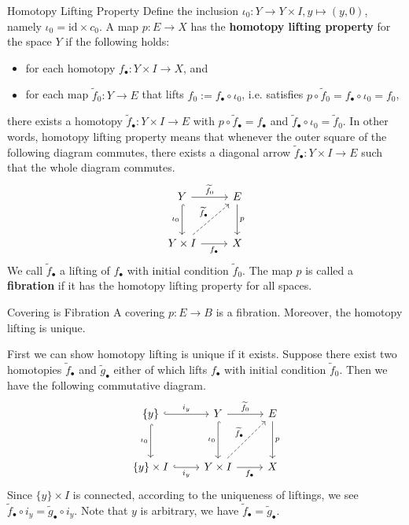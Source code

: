 \documentclass{report}
\begin{document}
\begin{definition}{Homotopy Lifting Property}{}
	Define the inclusion $\iota_0:Y\to Y\times I,y\mapsto(y,0)$, namely $\iota_0=\mathrm{id}\times c_0$. A map $p: E \rightarrow X$ has the \textbf{homotopy lifting property} for the space $Y$ if the following holds:
	\begin{itemize}
		\item for each homotopy $f_\bullet: Y \times I \rightarrow X$, and
		\item for each map $\widetilde{f}_0: Y \rightarrow E$ that lifts $f_0:=f_{\bullet} \circ\iota_0$, i.e. satisfies $p \circ \widetilde{f}_0=f_{\bullet} \circ\iota_0=f_0$,
	\end{itemize}
	there exists a homotopy $\widetilde{f}_{\bullet}: Y \times I \rightarrow E$ with $p \circ \widetilde{f}_{\bullet}=f_{\bullet}$ and $ \widetilde{f}_{\bullet} \circ \iota_0=\widetilde{f}_0$. In other words, homotopy lifting property means that whenever the outer square of the following diagram commutes, there exists a diagonal arrow $\widetilde{f}_{\bullet}:Y\times I\to E$ such that the whole diagram commutes.
	\[
		\begin{tikzcd}[ampersand replacement=\&]
			Y \arrow[r, "\widetilde{f}_0"] \arrow[d, "\iota_0"', hook]                      \& E \arrow[d, "p"] \\ [+10pt]
			Y\times I \arrow[r, "f_\bullet"'] \arrow[ru, "\widetilde{f}_{\bullet}", dashed] \& X
		\end{tikzcd}
	\]
	We call $\widetilde{f}_{\bullet}$ a lifting of $f_{\bullet}$ with initial condition $\widetilde{f}_0$. The map $p$ is called a \textbf{fibration} if it has the homotopy lifting property for all spaces.
\end{definition}


\begin{theorem}{Covering is Fibration}{}
	A covering $p: E \rightarrow B$ is a fibration. Moreover, the homotopy lifting is unique.
\end{theorem}

\begin{prf}
	First we can show homotopy lifting is unique if it exists. Suppose there exist two homotopies $\widetilde{f}_{\bullet}$ and $\widetilde{g}_{\bullet}$ either of which lifts $f_{\bullet}$ with initial condition $\widetilde{f}_0$. Then we have the following commutative diagram.
	\[
		\begin{tikzcd}[ampersand replacement=\&]
			\{y\}\arrow[r, "i_y", hook]\arrow[d, "\iota_0"', hook]\&Y \arrow[r, "\widetilde{f}_0"] \arrow[d, "\iota_0"', hook]                      \& E \arrow[d, "p"] \\ [+13pt]
			\{y\} \arrow[r, "i_y"', hook]  \times I\&Y\times I \arrow[r, "f_\bullet"'] \arrow[ru, "\widetilde{f}_{\bullet}", dashed] \& X
		\end{tikzcd}
	\]
	Since $\{y\}\times I$ is connected, according to the uniqueness of liftings, we see $\widetilde{f}_{\bullet}\circ i_y=\widetilde{g}_{\bullet}\circ i_y$. Note that $y$ is arbitrary, we have $\widetilde{f}_{\bullet}=\widetilde{g}_{\bullet}$.
\end{prf}
\end{document}

